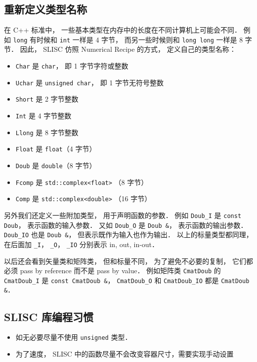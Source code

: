 \subsection{重新定义类型名称}
在 C++ 标准中， 一些基本类型在内存中的长度在不同计算机上可能会不同． 例如 \verb|long| 有时候和 \verb|int| 一样是 4 字节， 而另一些时候则和 \verb|long long| 一样是 8 字节． 因此， SLISC 仿照 Numerical Recipe 的方式， 定义自己的类型名称：
\begin{itemize}
\item \verb|Char| 是 \verb|char|， 即 1 字节字符或整数
\item \verb|Uchar| 是 \verb|unsigned char|， 即 1 字节无符号整数
\item \verb|Short| 是 2 字节整数
\item \verb|Int| 是 4 字节整数
\item \verb|Llong| 是 8 字节整数
\item \verb|Float| 是 \verb|float|（4 字节）
\item \verb|Doub| 是 \verb|double|（8 字节）

\item \verb|Fcomp| 是 \verb|std::complex<float>| （8 字节）
\item \verb|Comp| 是 \verb|std::complex<double>| （16 字节）
\end{itemize}
另外我们还定义一些附加类型， 用于声明函数的参数． 例如 \verb|Doub_I| 是 \verb|const Doub|， 表示函数的输入参数． 又如 \verb|Doub_O| 是 \verb|Doub &|， 表示函数的输出参数． \verb|Doub_IO| 也是 \verb|Doub &|， 但表示既作为输入也作为输出． 以上的标量类型都同理， 在后面加 \verb|_I|， \verb|_O|， \verb|_IO| 分别表示 in, out, in-out．

以后还会看到矢量类和矩阵类， 但和标量不同， 为了避免不必要的复制， 它们都必须 pass by reference 而不是 pass by value． 例如矩阵类 \verb|CmatDoub| 的 \verb|CmatDoub_I| 是 \verb|const CmatDoub &|， \verb|CmatDoub_O| 和 \verb|CmatDoub_IO| 都是 \verb|CmatDoub &|．

\subsection{SLISC 库编程习惯}
\begin{itemize}
\item 如无必要尽量不使用 \verb|unsigned| 类型．
\item 为了速度， SLISC 中的函数尽量不会改变容器尺寸，需要实现手动设置
\end{itemize}
